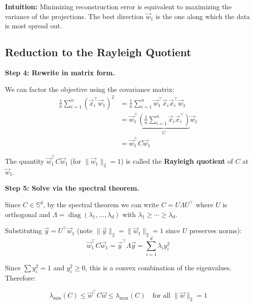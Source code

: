 \documentclass[10pt, twocolumn]{article}
\theoremstyle{definition}
\theoremstyle{plain}
\DeclareMathOperator{\diag}{diag}
\begin{document}
\begin{tcolorbox}[colframe=black!50]
\textbf{Intuition:} Minimizing reconstruction error is equivalent to maximizing the variance of the projections. The best direction $\vec{w}_1$ is the one along which the data is most spread out.
\end{tcolorbox}

\subsection{Reduction to the Rayleigh Quotient}

\textbf{Step 4: Rewrite in matrix form.}

We can factor the objective using the covariance matrix:
\begin{align*}
    \frac{1}{n} \sum_{i=1}^{n} (\vec{x}_i^\top \vec{w}_1)^2 &= \frac{1}{n} \sum_{i=1}^{n} \vec{w}_1^\top \vec{x}_i \vec{x}_i^\top \vec{w}_1 \\
    &= \vec{w}_1^\top \underbrace{\left(\frac{1}{n} \sum_{i=1}^{n} \vec{x}_i \vec{x}_i^\top\right)}_{C} \vec{w}_1 \\
    &= \vec{w}_1^\top C \vec{w}_1
\end{align*}

The quantity $\vec{w}_1^\top C \vec{w}_1$ (for $\|\vec{w}_1\|_2 = 1$) is called the \textbf{Rayleigh quotient} of $C$ at $\vec{w}_1$.

\textbf{Step 5: Solve via the spectral theorem.}

Since $C \in \mathbb{S}^d$, by the spectral theorem we can write $C = U \Lambda U^\top$ where $U$ is orthogonal and $\Lambda = \diag(\lambda_1, \ldots, \lambda_d)$ with $\lambda_1 \ge \cdots \ge \lambda_d$.

Substituting $\vec{y} = U^\top \vec{w}_1$ (note $\|\vec{y}\|_2 = \|\vec{w}_1\|_2 = 1$ since $U$ preserves norms):
\[
    \vec{w}_1^\top C \vec{w}_1 = \vec{y}^\top \Lambda \vec{y} = \sum_{i=1}^{d} \lambda_i y_i^2
\]

Since $\sum y_i^2 = 1$ and $y_i^2 \ge 0$, this is a convex combination of the eigenvalues. Therefore:

\begin{result}
\[
    \lambda_{\min}(C) \le \vec{w}^\top C \vec{w} \le \lambda_{\max}(C) \quad \text{for all } \|\vec{w}\|_2 = 1
\]
\end{result}
\end{document}
